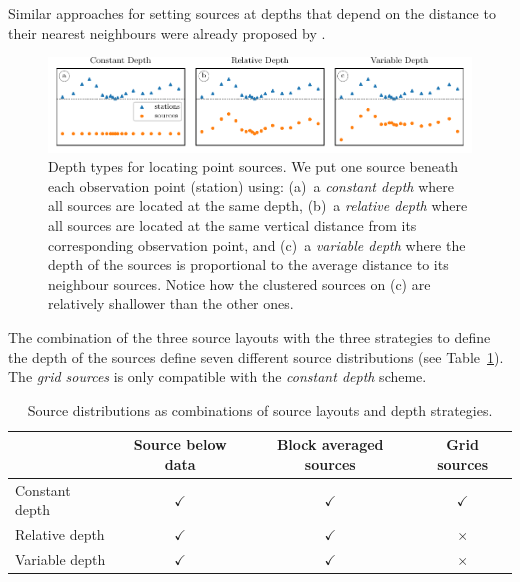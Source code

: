 \documentclass[twocolumn]{article}
\begin{document}
Similar approaches for setting sources at depths that depend
on the distance to their nearest neighbours were already proposed by
\citet{cordell1992, guspi2004, guspi2009}.

\begin{figure}
    \includegraphics[width=\linewidth]{figs/depth_types.pdf}
    \caption{
        Depth types for locating point sources. We put one source beneath each
        observation point (station) using:
        (a)~a \emph{constant depth} where all sources are located at the same
           depth,
        (b)~a \emph{relative depth} where all sources are located at the same
           vertical distance from its corresponding observation point, and
        (c)~a \emph{variable depth} where the depth of the sources is
           proportional to the average distance to its neighbour sources.
           Notice how the clustered sources on (c) are relatively shallower
           than the
           other ones.
    }
    \label{fig:depth-types}
\end{figure}

The combination of the three source layouts with the three strategies to define
the depth of the sources define seven different source distributions (see
Table~\ref{tab:source-distributions}).
The \emph{grid sources} is only compatible with the \emph{constant depth}
scheme.

\begin{table}
    \centering
    \caption{
        Source distributions as combinations of source layouts and depth
        strategies.
    }
    \label{tab:source-distributions}
    \begin{tabular}{lccc}
        & Source below data & Block averaged sources & Grid sources \\ \hline
        Constant depth & $\checkmark$ & $\checkmark$ & $\checkmark$ \\
        Relative depth & $\checkmark$ & $\checkmark$ & $\times$     \\
        Variable depth & $\checkmark$ & $\checkmark$ & $\times$     \\
    \end{tabular}
\end{table}
\end{document}
